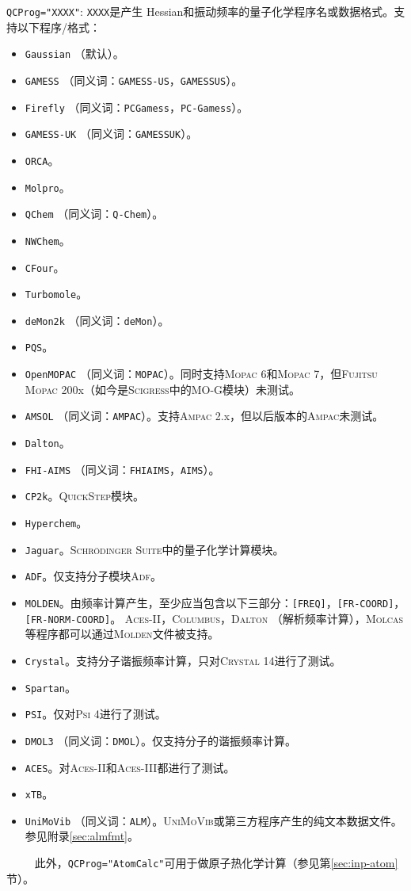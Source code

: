 \documentclass[12pt,a4paper,openany,twoside,cap,UTF8]{ctexbook}
\begin{document}
\bigskip{}\noindent
\verb|QCProg="XXXX"|: \verb|XXXX|是产生 Hessian和振动频率的量子化学程序名或数据格式。支持以下程序/格式：
\begin{itemize}
\item \verb|Gaussian| （默认）。
\item \verb|GAMESS| （同义词：\verb|GAMESS-US|，\verb|GAMESSUS|）。
\item \verb|Firefly| （同义词：\verb|PCGamess|，\verb|PC-Gamess|）。
\item \verb|GAMESS-UK| （同义词：\verb|GAMESSUK|）。
\item \verb|ORCA|。
\item \verb|Molpro|。
\item \verb|QChem| （同义词：\verb|Q-Chem|）。
\item \verb|NWChem|。
\item \verb|CFour|。
\item \verb|Turbomole|。
\item \verb|deMon2k| （同义词：\verb|deMon|）。
\item \verb|PQS|。
\item \verb|OpenMOPAC| （同义词：\verb|MOPAC|）。同时支持\textsc{Mopac} 6和\textsc{Mopac} 7，但\textsc{Fujitsu Mopac} 200x（如今是\textsc{Scigress}中的MO-G模块）未测试。
\item \verb|AMSOL| （同义词：\verb|AMPAC|）。支持\textsc{Ampac} 2.x，但以后版本的\textsc{Ampac}未测试。
\item \verb|Dalton|。
\item \verb|FHI-AIMS| （同义词：\verb|FHIAIMS|，\verb|AIMS|）。
\item \verb|CP2k|。\textsc{QuickStep}模块。
\item \verb|Hyperchem|。
\item \verb|Jaguar|。\textsc{Schr\"odinger Suite}中的量子化学计算模块。
\item \verb|ADF|。仅支持分子模块\textsc{Adf}。
\item \verb|MOLDEN|。由频率计算产生，至少应当包含以下三部分：\verb|[FREQ]|，\verb|[FR-COORD]|，\verb|[FR-NORM-COORD]|。 \textsc{Aces-II}，\textsc{Columbus}，\textsc{Dalton} （解析频率计算），\textsc{Molcas}等程序都可以通过\textsc{Molden}文件被支持。
\item \verb|Crystal|。支持分子谐振频率计算，只对\textsc{Crystal} 14进行了测试。
\item \verb|Spartan|。
\item \verb|PSI|。仅对\textsc{Psi} 4进行了测试。
\item \verb|DMOL3| （同义词：\verb|DMOL|）。仅支持分子的谐振频率计算。
\item \verb|ACES|。对\textsc{Aces-II}和\textsc{Aces-III}都进行了测试。
\item \verb|xTB|。
\item \verb|UniMoVib| （同义词：\verb|ALM|）。\textsc{UniMoVib}或第三方程序产生的纯文本数据文件。参见附录\ref{sec:almfmt}。
\end{itemize}
\verb|     |此外，\verb|QCProg="AtomCalc"|可用于做原子热化学计算（参见第\ref{sec:inp-atom}节）。
\end{document}
